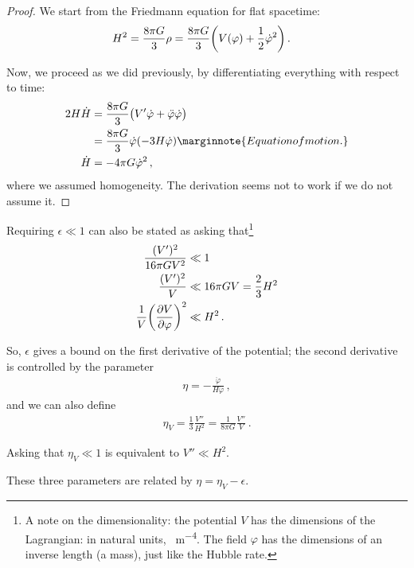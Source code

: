 \documentclass[main.tex]{subfiles}
\begin{document}
\begin{proof}

We start from the Friedmann equation for flat spacetime: 
%
\begin{align}
H^2 &= \frac{8 \pi G}{3} \rho = \frac{8 \pi G}{3} \qty(V(\varphi ) + \frac{1}{2} \dot{\varphi}^2 
) 
\,.
\end{align}

Now, we proceed as we did previously, by differentiating everything with respect to time: 
%
\begin{align}
2 H \dot{H} &= \frac{8 \pi G}{3} \qty( V' \dot{\varphi} + \ddot{\varphi} \dot{\varphi})  \\
&= \frac{8 \pi G}{3} \dot{\varphi} \qty(- 3 H \dot{\varphi}) \marginnote{Equation of motion.}  \\
\dot{H} &= - 4 \pi G \dot{\varphi}^2
\,,
\end{align}
%
where we assumed homogeneity. The derivation seems not to work if we do not assume it. 
\end{proof}


Requiring \(\epsilon \ll 1\) can also be stated as asking that\footnote{A note on the dimensionality: the potential \(V\) has the dimensions of the Lagrangian: in natural units, \SI{}{m^{-4}}. The field \(\varphi \) has the dimensions of an inverse length (a mass), just like the Hubble rate.}
%
\begin{align}
\frac{(V')^2}{16 \pi G V^2} &\ll 1  \\
\frac{(V')^2}{V} &\ll 16 \pi G V = \frac{2}{3} H^2 \\ 
\frac{1}{V} \qty(\pdv{V}{\varphi })^2 &\ll H^2
\,.
\end{align}

So, \(\epsilon \) gives a bound on the first derivative of the potential; the second derivative is controlled by the parameter 
%
\begin{align}
\eta = - \frac{\ddot{\varphi}}{H \dot{\varphi}
}
\,,
\end{align}
%
and we can also define 
%
\begin{align}
\eta _V = \frac{1}{3} \frac{V''}{H^2} = \frac{1}{8 \pi G} \frac{V''}{V}
\,.
\end{align}

Asking that \(\eta _V \ll 1 \) is equivalent to \(V'' \ll H^2\). 

\begin{claim}
These three parameters are related by \(\eta = \eta _V - \epsilon \).
\end{claim}
\end{document}
